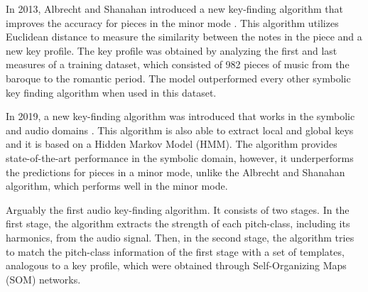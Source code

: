 In 2013, Albrecht and Shanahan introduced a new key-finding
algorithm that improves the accuracy for pieces in the minor
mode \cite{albrecht2013use}. This algorithm utilizes
Euclidean distance to measure the similarity between the
notes in the piece and a new key profile. The key profile
was obtained by analyzing the first and last measures of a
training dataset, which consisted of 982 pieces of music
from the baroque to the romantic period. The model
outperformed every other symbolic key finding algorithm when
used in this dataset.




In 2019, a new key-finding algorithm was introduced that
works in the symbolic and audio domains
\cite{napoleslopez2019keyfinding}. This algorithm is also
able to extract local and global keys and it is based on a
Hidden Markov Model (HMM). The algorithm provides
state-of-the-art performance in the symbolic domain,
however, it underperforms the predictions for pieces in a
minor mode, unlike the Albrecht and Shanahan algorithm,
which performs well in the minor mode.




Arguably the first audio key-finding algorithm. It consists
of two stages. In the first stage, the algorithm extracts
the strength of each pitch-class, including its harmonics,
from the audio signal. Then, in the second stage, the
algorithm tries to match the pitch-class information of the
first stage with a set of templates, analogous to a key
profile, which were obtained through Self-Organizing Maps
(SOM) networks.

